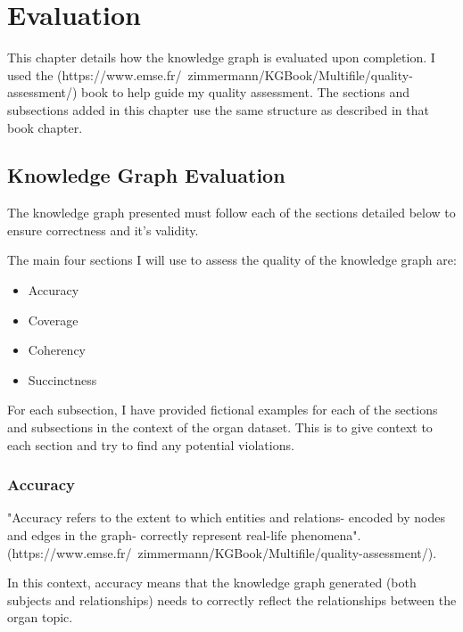 \chapter{Evaluation}
This chapter details how the knowledge graph is evaluated upon completion. I used the (https://www.emse.fr/~zimmermann/KGBook/Multifile/quality-assessment/) book to help guide my quality assessment. The sections and subsections added in this chapter use the same structure as described in that book chapter. 

\section{Knowledge Graph Evaluation}
\hspace{0.5cm} The knowledge graph presented must follow each of the sections detailed below to ensure correctness and it's validity. 

The main four sections I will use to assess the quality of the knowledge graph are:

\begin{itemize}
\item Accuracy
\item Coverage
\item Coherency
\item Succinctness
\end{itemize}

For each subsection, I have provided fictional examples for each of the sections and subsections in the context of the organ dataset. This is to give context to each section and try to find any potential violations. 

\subsection{Accuracy}
\hspace{0.5cm} "Accuracy refers to the extent to which entities and relations- encoded by nodes and edges in the graph- correctly represent real-life phenomena". \\ (https://www.emse.fr/~zimmermann/KGBook/Multifile/quality-assessment/). 

In this context, accuracy means that the knowledge graph generated (both subjects and relationships) needs to correctly reflect the relationships between the organ topic. 

